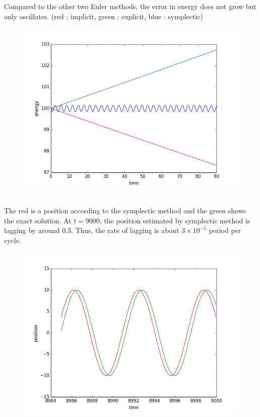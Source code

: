\documentclass[10pt]{article}
\begin{document}
Compared to the other two Euler methods, the error in energy does not grow but only oscillates. (red : implicit, green : explicit, blue : symplectic)\\

\begin{figure}[!h]
\centering
\includegraphics[scale=0.5]{w3fig12.png}
\end{figure}

\newpage

\subsection{}
The red is a position according to the symplectic method and the green shows the exact solution. At $t=9000$, the position estimated by symplectic method is lagging by around $0.3$. Thus, the rate of lagging is about $3 \times 10^{-5}$ period per cycle. 
\begin{figure}[!h]
\centering
\includegraphics[scale=0.5]{w3fig14.png}
\end{figure}
\end{document}
